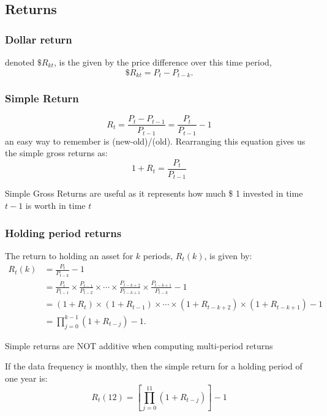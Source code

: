 \documentclass[11pt]{article}
\begin{document}
\subsection{Returns}
\subsubsection{Dollar return} 
denoted $\$ R_{kt}$, is the given by the price difference over this time period,
\[\$ R_{kt} = P_t - P_{t-k}.\]

\subsubsection{Simple Return}
\[R_t = \dfrac{P_t - P_{t-1}}{P_{t-1}} = \dfrac{P_t}{P_{t-1}}-1\]
an easy way to remember is (new-old)/(old). Rearranging this equation gives us the simple gross returns as:
\[1 + R_t = \dfrac{P_t}{P_{t-1}}\]
\begin{note}
    Simple Gross Returns are useful as it represents how much \$ 1 invested in time $t-1$ is worth in time $t$
\end{note}

\subsubsection{Holding period returns}
The return to holding an asset for $k$ periods, $R_t(k)$, is given by:
\begin{equation*}
\begin{aligned}
R_t(k) & =\frac{P_t}{P_{t-k}}-1 \\
& =\frac{P_t}{P_{t-1}} \times \frac{P_{t-1}}{P_{t-2}} \times \cdots \times \frac{P_{t-k+2}}{P_{t-k+1}} \times \frac{P_{t-k+1}}{P_{t-k}}-1 \\
& =\left(1+R_t\right) \times\left(1+R_{t-1}\right) \times \cdots \times\left(1+R_{t-k+2}\right) \times\left(1+R_{t-k+1}\right)-1 \\
& =\prod_{j=0}^{k-1}\left(1+R_{t-j}\right)-1 .
\end{aligned}
\end{equation*}

\begin{note}
    Simple returns are NOT additive when computing multi-period returns
\end{note}

If the data frequency is monthly, then the simple return for a holding period of one year is:
\[R_t(12) = \left[ \prod_{j=0}^{11} (1 + R_{t-j}) \right] - 1\]
\end{document}
